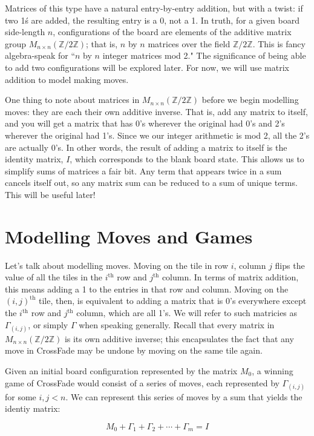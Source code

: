 \documentclass{article}[12pt]
\newcommand{\supt}[1]{^{\text{#1}}}
\newcommand{\gen}[2]{\Gamma_{(#1,#2)}}
\newcommand{\group}[1]{M_{#1 \times #1}(\mathbb{Z}/2\mathbb{Z})}
\begin{document}
Matrices of this type have a natural entry-by-entry addition, but with a twist: if two 1\'s are added, the resulting entry is a 0, not a 1.  In truth, for a given board side-length $n$, configurations of the board are elements of the additive matrix group $\group{n}$; that is, $n$ by $n$ matrices over the field $\mathbb{Z}/2\mathbb{Z}$.  This is fancy algebra-speak for ``$n$ by $n$ integer matrices mod 2."  The significance of being able to add two configurations will be explored later.  For now, we will use matrix addition to model making moves.

One thing to note about matrices in $\group{n}$ before we begin modelling moves: they are each their own additive inverse.  That is, add any matrix to itself, and you will get a matrix that has 0's wherever the original had 0's and 2's wherever the original had 1's.  Since we our integer arithmetic is mod 2, all the 2's are actually 0's.  In other words, the result of adding a matrix to itself is the identity matrix, $I$, which corresponds to the blank board state.  This allows us to simplify sums of matrices a fair bit.  Any term that appears twice in a sum cancels itself out, so any matrix sum can be reduced to a sum of unique terms.  This will be useful later!

\section{Modelling Moves and Games}

Let's talk about modelling moves.  Moving on the tile in row $i$, column $j$ flips the value of all the tiles in the $i\supt{th}$ row and $j\supt{th}$ column.  In terms of matrix addition, this means adding a 1 to the entries in that row and column.  Moving on the $(i,j)\supt{th}$ tile, then, is equivalent to adding a matrix that is 0's everywhere except the $i\supt{th}$ row and $j\supt{th}$ column, which are all 1's.  We will refer to such matricies as $\gen{i}{j}$, or simply $\Gamma$ when speaking generally.  Recall that every matrix in $\group{n}$ is its own additive inverse; this encapsulates the fact that any move in CrossFade may be undone by moving on the same tile again.

Given an initial board configuration represented by the matrix $M_0$, a winning game of CrossFade would consist of a series of moves, each represented by $\gen{i}{j}$ for some $i, j < n$.  We can represent this series of moves by a sum that yields the identiy matrix:

\begin{equation}
\label{model_game_1}
M_0 + \Gamma_1 + \Gamma_2 + \cdots + \Gamma_m = I
\end{equation}
\end{document}
